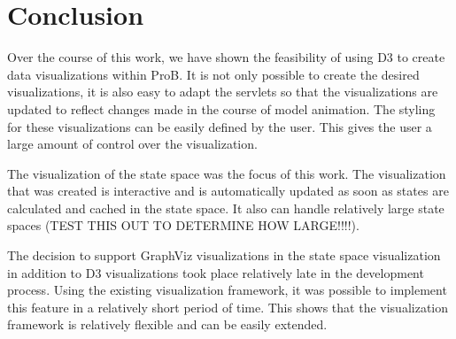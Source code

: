 \section{Conclusion}

Over the course of this work, we have shown the feasibility of using D3 to create data visualizations within ProB. It is not only possible to create the desired visualizations, it is also easy to adapt the servlets so that the visualizations are updated to reflect changes made in the course of model animation. The styling for these visualizations can be easily defined by the user. This gives the user a large amount of control over the visualization.

The visualization of the state space was the focus of this work. The visualization that was created is interactive and is automatically updated as soon as states are calculated and cached in the state space. It also can handle relatively large state spaces (TEST THIS OUT TO DETERMINE HOW LARGE!!!!). 

The decision to support GraphViz visualizations in the state space visualization in addition to D3 visualizations took place relatively late in the development process. Using the existing visualization framework, it was possible to implement this feature in a relatively short period of time. This shows that the visualization framework is relatively flexible and can be easily extended.